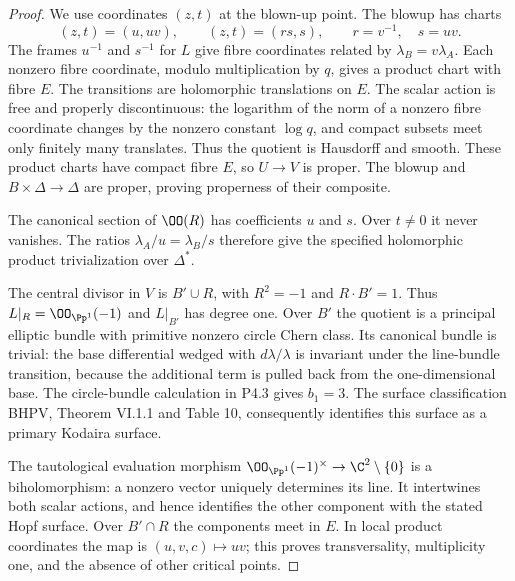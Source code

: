\begin{proof}
We use coordinates $(z,t)$ at the blown-up point. The blowup has charts
\[
 (z,t)=(u,uv),\qquad (z,t)=(rs,s),\qquad r=v^{-1},\quad s=uv.
\]
The frames $u^{-1}$ and $s^{-1}$ for $L$ give fibre coordinates related by
$\lambda_B=v\lambda_A$. Each nonzero fibre coordinate, modulo multiplication
by $q$, gives a product chart with fibre $E$. The transitions are holomorphic
translations on $E$. The scalar action is free and properly discontinuous:
the logarithm of the norm of a nonzero fibre coordinate changes by the
nonzero constant $\log q$, and compact subsets meet only finitely many
translates. Thus the quotient is Hausdorff and smooth. These product charts
have compact fibre $E$, so $U\to V$ is proper. The blowup and $B\times\Delta
\to\Delta$ are proper, proving properness of their composite.

The canonical section of $\OO(R)$ has coefficients $u$ and $s$. Over
$t\ne0$ it never vanishes. The ratios $\lambda_A/u=\lambda_B/s$ therefore
give the specified holomorphic product trivialization over $\Delta^*$.

The central divisor in $V$ is $B'\cup R$, with $R^2=-1$ and $R\cdot B'=1$.
Thus $L|_R=\OO_{\Pp^1}(-1)$ and $L|_{B'}$ has degree one. Over $B'$ the
quotient is a principal elliptic bundle with primitive nonzero circle Chern
class. Its canonical bundle is trivial: the base differential wedged with
$d\lambda/\lambda$ is invariant under the line-bundle transition, because
the additional term is pulled back from the one-dimensional base. The
circle-bundle calculation in P4.3 gives $b_1=3$. The surface classification
BHPV, Theorem VI.1.1 and Table 10, consequently identifies this surface as
a primary Kodaira surface.

The tautological evaluation morphism
$\OO_{\Pp^1}(-1)^\times\to\C^2\setminus\{0\}$ is a biholomorphism: a
nonzero vector uniquely determines its line. It intertwines both scalar
actions, and hence identifies the other component with the stated Hopf
surface. Over $B'\cap R$ the components meet in $E$. In local product
coordinates the map is $(u,v,c)\mapsto uv$; this proves transversality,
multiplicity one, and the absence of other critical points.
\end{proof}

